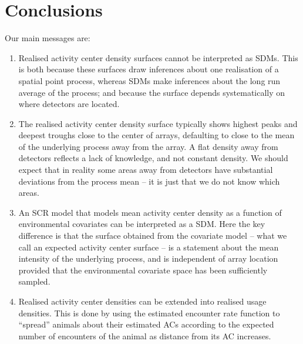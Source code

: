\documentclass[useAMS,usenatbib,referee]{biom}
\begin{document}
\section{Conclusions}

Our main messages are:
\begin{enumerate}
\item Realised activity center density surfaces cannot be interpreted as SDMs. This is both because these surfaces draw inferences about one realisation of a spatial point process, whereas SDMs make inferences about the long run average of the process; and because the surface depends systematically on where detectors are located.
\item The realised activity center density surface typically shows highest peaks and deepest troughs close to the center of arrays, defaulting to close to the mean of the underlying process away from the array. A flat density away from detectors reflects a lack of knowledge, and not constant density. We should expect that in reality some areas away from detectors have substantial deviations from the process mean -- it is just that we do not know which areas.

\item An SCR model that models mean activity center density as a function of environmental covariates can be interpreted as a SDM. Here the key difference is that the surface obtained from the covariate model -- what we call an expected activity center surface -- is a statement about the mean intensity of the underlying process, and is independent of array location provided that the environmental covariate space has been sufficiently sampled.

\item Realised activity center densities can be extended into realised usage densities. This is done by using the estimated encounter rate function to ``spread'' animals about their estimated ACs according to the expected number of encounters of the animal as distance from its AC increases. 
\end{enumerate}
\end{document}
